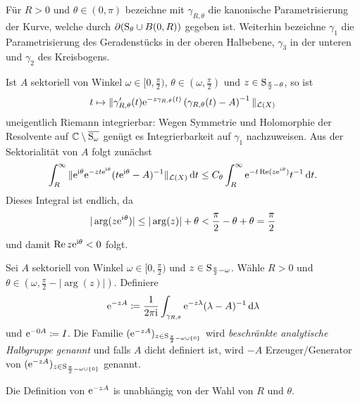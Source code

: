 \begin{ntion}
  Für $R > 0$ und $\theta \in (0,\pi)$ bezeichne mit $\gamma_{R, \theta}$ die kanonische Parametrisierung der Kurve, welche durch $\partial(\mathrm{S}_\theta \cup B(0,R))$ gegeben ist.
  Weiterhin bezeichne $\gamma_1$ die Parametrisierung des Geradenstücks in der oberen Halbebene, $\gamma_3$ in der unteren und $\gamma_2$ des Kreisbogens.
\end{ntion}

\begin{obs}
  \label{obs:integrablePath}
  Ist $A$ sektoriell von Winkel $\omega \in [0,\frac{\pi}{2} )$, $\theta \in (\omega, \frac{\pi}{2})$ und $z \in \mathrm{S}_{\frac{\pi}{2} - \theta}$, so ist 
  $$
  t \mapsto \|\gamma'_{R,\theta}(t) \mathrm{e}^{-z\gamma_{R,\theta}(t)} \left( \gamma_{R, \theta}(t) - A \right)^{-1} \|_{\mathcal{L}(X)}
  $$
  uneigentlich Riemann integrierbar: 
  Wegen Symmetrie und Holomorphie der Resolvente auf $\mathbb{C} \setminus \overline{\mathrm{S}_\omega}$ genügt es Integrierbarkeit auf $\gamma_1$ nachzuweisen.
  Aus der Sektorialität von $A$ folgt zunächst
  $$
    \int_{R}^\infty \| \mathrm{e}^{\mathrm{i}\theta} \mathrm{e}^{-zt \mathrm{e}^{\mathrm{i}\theta}} ( t\mathrm{e}^{\mathrm{i}\theta} - A )^{-1} \|_{\mathcal{L}(X)} \, {\operatorname{d}\!{t}}
    \leq C_\theta \int_R^\infty \mathrm{e}^{-t \operatorname{Re}(z \mathrm{e}^{i \theta})} t^{-1} \, {\operatorname{d}\!{t}}.
  $$
  Dieses Integral ist endlich, da
  $$
  |\arg(z \mathrm{e}^{i \theta})| \leq |\arg(z)| + \theta < \frac{\pi}{2} - \theta + \theta = \frac{\pi}{2}
  $$
  und damit $\operatorname{Re}z \mathrm{e}^{\mathrm{i}\theta} < 0$ folgt.
\end{obs}

\begin{defn}
  Sei $A$ sektoriell von Winkel $\omega \in [0,\frac{\pi}{2})$ und $z \in \mathrm{S}_{\frac{\pi}{2} - \omega}$.
    Wähle $R > 0$ und $\theta \in (\omega, \frac{\pi}{2} - |\arg(z)|)$.
    Definiere
    $$
    \mathrm{e}^{-zA} \coloneqq \frac{1}{2\pi \mathrm{i}} \int_{\gamma_{R, \theta}} \mathrm{e}^{-z\lambda } (\lambda - A)^{-1} \, {\operatorname{d}\!{\lambda}}
    $$
    und $\mathrm{e}^{-0A} \coloneqq I$.
    Die Familie $(\mathrm{e}^{-zA})_{z \in \mathrm{S}_{\frac{\pi}{2} - \omega \cup \{0\}}}$  wird \emph{beschränkte analytische Halbgruppe genannt} und falls $A$ dicht definiert ist, wird $-A$ Erzeuger/Generator von $(\mathrm{e}^{-zA})_{z \in \mathrm{S}_{\frac{\pi}{2} - \omega \cup \{0\}}}$ genannt.
\end{defn}

\begin{lem}
  \label{lem:welldefinedsg}
  Die Definition von $\mathrm{e}^{-zA}$ is unabhängig von der Wahl von $R$ und $\theta$.
\end{lem}


